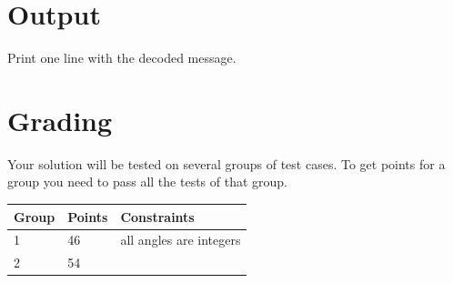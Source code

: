 \section*{Output}
Print one line with the decoded message.

\section*{Grading}
Your solution will be tested on several groups of test cases. To get points for a group you need to pass all the tests of that group.

\begin{tabular}{| l | l | l |}
	\hline
	Group & Points & Constraints\\ \hline
  1     & 46         & all angles are integers \\ \hline
  2     & 54         & \\ \hline
\end{tabular}
